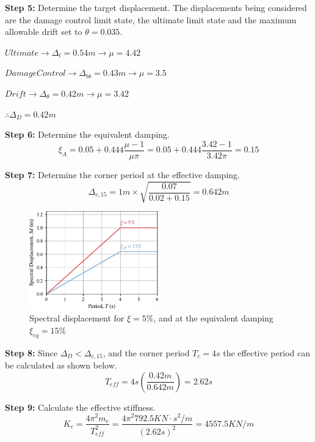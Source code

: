 \textbf{Step 5:} Determine the target displacement. The displacements being considered are the damage control limit state, the ultimate limit state and the maximum allowable drift set to $\theta=0.035$.

$Ultimate \to \Delta_{t}=0.54 m \to \mu=4.42$

$Damage Control \to \Delta_{bb} =0.43 m \to \mu=3.5$

$Drift \to \Delta_{\theta}=0.42 m \to \mu=3.42$

$\therefore \Delta_{D}=0.42m$

\textbf{Step 6:} Determine the equivalent damping.
\begin{displaymath}
    \xi_{A}=0.05+0.444\frac{\mu-1}{\mu\pi}=0.05+0.444\frac{3.42-1}{3.42\pi}=0.15
\end{displaymath}

\textbf{Step 7:} Determine the corner period at the effective damping.
\begin{displaymath}
    \Delta_{c,15}=1 m \times \sqrt{\frac{0.07}{0.02+0.15}} = 0.642 m
\end{displaymath}

\begin{figure}[htbp]
	\centering
	\includegraphics[width=0.5\textwidth]{VAC Thesis 2.0/Chapter-6/figs/SD_Design_5.pdf}
	\caption{Spectral displacement for $\xi=5\%$, and at the equivalent damping $\xi_{eq}=15\%$}
	\label{fig:spectral_displacement_design}
\end{figure}

\textbf{Step 8:} Since $\Delta_{D}<\Delta_{c,15}$, and the corner period $T_{c}=4s$ the effective period can be calculated as shown below.
\begin{displaymath}
    T_{eff}=4s \left(\frac{0.42m}{0.642m}\right)=2.62s
\end{displaymath}

\textbf{Step 9:} Calculate the effective stiffness.
\begin{displaymath}
    K_{e}=\frac{4\pi^2m_{e}}{T_{eff}^2}=\frac{4\pi^2 792.5 KN\cdot s^2/m}{(2.62s)^2}=4557.5 KN/m
\end{displaymath}

